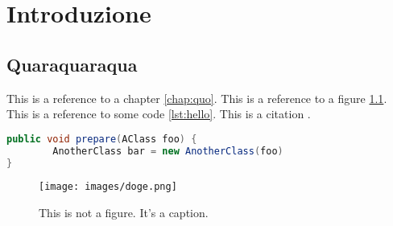 \chapter{Introduzione}
\label{chap:introduzione}

\section{Quaraquaraqua}
\label{sec:quaqaraqua}

This is a reference to a chapter \ref{chap:quo}. This is a reference to a figure \ref{fig:doge}. This is a reference to some code \ref{lst:hello}. This is a citation \cite{famous:paper}.



\begin{lstlisting}[language=Java, label=lst:java, caption={Some code in another language than the default one}]
public void prepare(AClass foo) {
        AnotherClass bar = new AnotherClass(foo)
}
\end{lstlisting}

\Blindtext

\begin{figure}
\begin{center}
\texttt{[image: images/doge.png]}
\end{center}
\caption{This is not a figure. It's a caption.}
\label{fig:doge}
\end{figure}